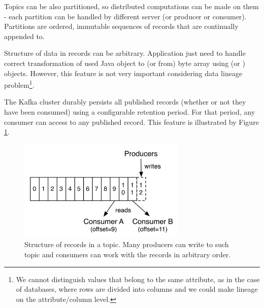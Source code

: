 Topics can be also partitioned, so distributed computations can be made
on them - each partition can be handled by different server (or producer or consumer).
Partitions are ordered, immutable sequences of records that are continually appended to.

Structure of data in records can be arbitrary. Application just need to handle
correct transformation of used Java object to (or from) byte array using
 (or ) objects.
However, this feature is not very important considering data lineage problem\footnote{
  We cannot distinguish values that belong to the same attribute, as in the case
  of databases, where rows are divided into columns and we could make
  lineage on the attribute/column level.
}.

The Kafka cluster durably persists all published records (whether or not they have been consumed)
using a configurable retention period. For that period, any consumer can access
to any published record. This feature is illustrated by Figure \ref{frameworks:kafka:topic}.

\begin{figure}[h]
  \center
  \includegraphics[width=80mm]{img/kafka-topic-structure.png}
  \caption{Structure of records in a topic. Many producers can write to such topic and consumers can work with the records in arbitrary order.}
  \label{frameworks:kafka:topic}
\end{figure}

